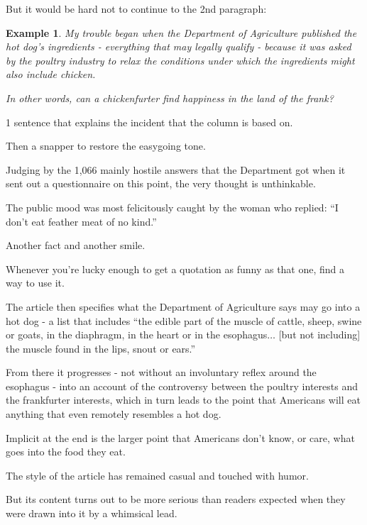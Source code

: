 \documentclass{book}
\numberwithin{equation}{section}
\newtheorem{example}{Example}[chapter]
\begin{document}
But it would be hard not to continue to the 2nd paragraph:
\begin{example}
    My trouble began when the Department of Agriculture published the hot dog's ingredients - everything that may legally qualify - because it was asked by the poultry industry to relax the conditions under which the ingredients might also include chicken.
    
    In other words, can a chickenfurter find happiness in the land of the frank?
\end{example}
1 sentence that explains the incident that the column is based on.

Then a snapper to restore the easygoing tone.

%
Judging by the 1,066 mainly hostile answers that the Department got when it sent out a questionnaire on this point, the very thought is unthinkable.

The public mood was most felicitously caught by the woman who replied: ``I don't eat feather meat of no kind.''

%
Another fact and another smile.

Whenever you're lucky enough to get a quotation as funny as that one, find a way to use it.

The article then specifies what the Department of Agriculture says may go into a hot dog - a list that includes ``the edible part of the muscle of cattle, sheep, swine or goats, in the diaphragm, in the heart or in the esophagus$\ldots$ [but not including] the muscle found in the lips, snout or ears.''

%
From there it progresses - not without an involuntary reflex around the esophagus - into an account of the controversy between the poultry interests and the frankfurter interests, which in turn leads to the point that Americans will eat anything that even remotely resembles a hot dog.

Implicit at the end is the larger point that Americans don't know, or care, what goes into the food they eat.

The style of the article has remained casual and touched with humor.

But its content turns out to be more serious than readers expected when they were drawn into it by a whimsical lead.
\end{document}
